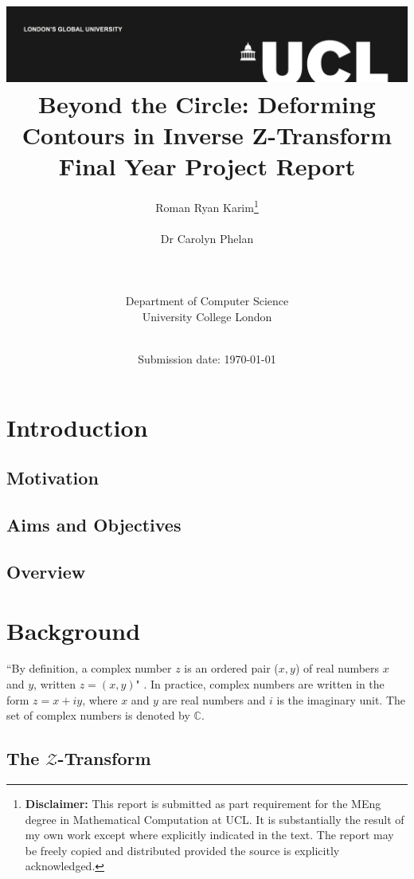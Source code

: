 \documentclass[a4paper]{report}
\title{{\vspace{-14em} \includegraphics[scale=0.4]{Logos/ucl_logo.png}}\\
{{\vspace{2em} \Huge Beyond the Circle: Deforming Contours in Inverse Z-Transform}}\\
{\large Final Year Project Report}\\
}
\date{Submission date: \today}
\author{Roman Ryan Karim\thanks{
{\bf Disclaimer:}
This report is submitted as part requirement for the MEng degree in Mathematical Computation at UCL. It is substantially the result of my own work except where explicitly indicated in the text. The report may be freely copied and distributed provided the source is explicitly acknowledged.}
\\ \\ Dr Carolyn Phelan
\\ \\ \\ \\ Department of Computer Science
\\ University College London
\\ \\
}
\begin{document}
 
\onehalfspacing
\maketitle
\begin{abstract}

\end{abstract}

\tableofcontents
\setcounter{page}{1}

\listoftodos

\chapter{Introduction}
\section{Motivation}

\section{Aims and Objectives}

\section{Overview}

\chapter{Background}
``By definition, a complex number $z$ is an ordered pair ($x, y$) of real numbers $x$ and $y$, written $z = (x, y)$" \citep{kreyszig2010advanced}. In practice, complex numbers are written in the form $z = x + iy$, where $x$ and $y$ are real numbers and $i$ is the imaginary unit. The set of complex numbers is denoted by $\mathbb{C}$.


\section{The \texorpdfstring{$\mathcal{Z}$}{Lg}-Transform}
\end{document}
